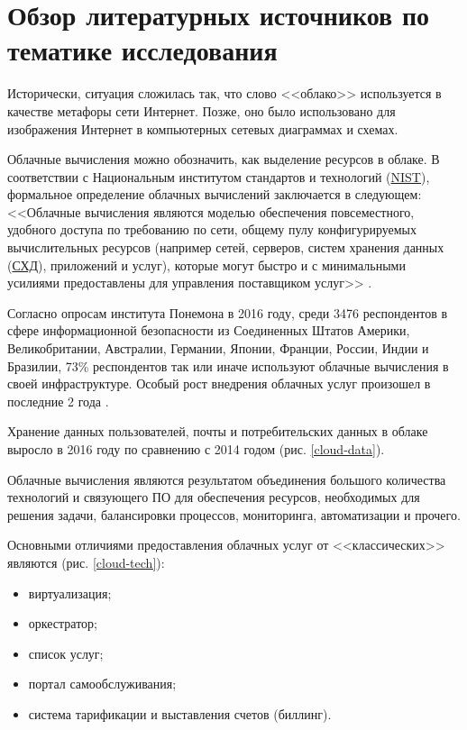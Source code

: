 \section{Обзор литературных источников по тематике исследования} \label{literature}

Исторически, ситуация сложилась так, что слово <<облако>> используется в качестве метафоры сети Интернет.
Позже, оно было использовано для изображения Интернет в компьютерных сетевых диаграммах и схемах.

Облачные вычисления можно обозначить, как выделение ресурсов в облаке.
В соответствии с Национальным институтом стандартов и технологий (\hyperlink{nist}{NIST}), формальное определение облачных вычислений заключается в следующем:
<<Облачные вычисления являются моделью обеспечения повсеместного, удобного доступа по требованию по сети, общему пулу конфигурируемых вычислительных ресурсов (например сетей, серверов, систем хранения данных (\hyperlink{storage}{СХД}), приложений и услуг), которые могут быстро и с минимальными усилиями предоставлены для управления поставщиком услуг>> \cite{nist}.

Согласно опросам института Понемона в 2016 году, среди 3476 респондентов в сфере информационной безопасности из Соединенных Штатов Америки, Великобритании, Австралии, Германии, Японии, Франции, России, Индии и Бразилии, 73\% респондентов так или иначе используют облачные вычисления в своей инфраструктуре.
Особый рост внедрения облачных услуг произошел в последние 2 года \cite{gemalto}.

Хранение данных пользователей, почты и потребительских данных в облаке выросло в 2016 году по сравнению с 2014 годом (рис. \ref{cloud-data}).


Облачные вычисления являются результатом объединения большого количества технологий и связующего ПО для обеспечения ресурсов, необходимых для решения задачи, балансировки процессов, мониторинга, автоматизации и прочего.

Основными отличиями предоставления облачных услуг от <<классических>> являются (рис. \ref{cloud-tech}):
\begin{itemize}
  \item виртуализация;
  \item оркестратор;
  \item список услуг;
  \item портал самообслуживания;
  \item система тарификации и выставления счетов (биллинг).
\end{itemize}

